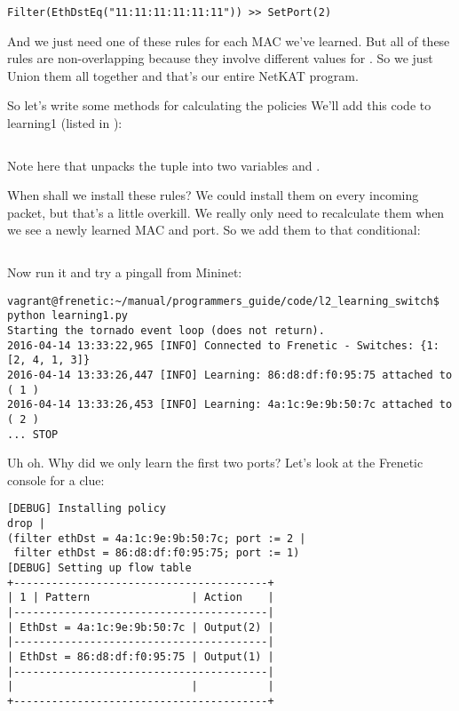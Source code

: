 \begin{verbatim}
Filter(EthDstEq("11:11:11:11:11:11")) >> SetPort(2)
\end{verbatim}

And we just need one of these rules for each MAC we've learned.  But all of these rules are non-overlapping
because they involve different values for .  So we just Union them all together and that's
our entire NetKAT program.

So let's write some methods for calculating the policies
We'll add this code to learning1 (listed in ):

\inputminted[firstline=23,lastline=31]{python}{code/l2_learning_switch/learning2.py}

Note here that  unpacks the tuple  into two variables
 and .

When shall we install these rules?   We could install them on every incoming packet, but that's a little
overkill. We really only need to recalculate them when we see a newly learned MAC and port.  So we add them
to that conditional:

\inputminted[firstline=41,lastline=43]{python}{code/l2_learning_switch/learning2.py}

Now run it and try a pingall from Mininet:

\begin{verbatim}
vagrant@frenetic:~/manual/programmers_guide/code/l2_learning_switch$ python learning1.py
Starting the tornado event loop (does not return).
2016-04-14 13:33:22,965 [INFO] Connected to Frenetic - Switches: {1: [2, 4, 1, 3]}
2016-04-14 13:33:26,447 [INFO] Learning: 86:d8:df:f0:95:75 attached to ( 1 )
2016-04-14 13:33:26,453 [INFO] Learning: 4a:1c:9e:9b:50:7c attached to ( 2 )
... STOP
\end{verbatim}

Uh oh.  Why did we only learn the first two ports?   Let's look at the Frenetic console for a clue:

\begin{verbatim}
[DEBUG] Installing policy
drop |
(filter ethDst = 4a:1c:9e:9b:50:7c; port := 2 |
 filter ethDst = 86:d8:df:f0:95:75; port := 1)
[DEBUG] Setting up flow table
+----------------------------------------+
| 1 | Pattern                | Action    |
|----------------------------------------|
| EthDst = 4a:1c:9e:9b:50:7c | Output(2) |
|----------------------------------------|
| EthDst = 86:d8:df:f0:95:75 | Output(1) |
|----------------------------------------|
|                            |           |
+----------------------------------------+
\end{verbatim}

